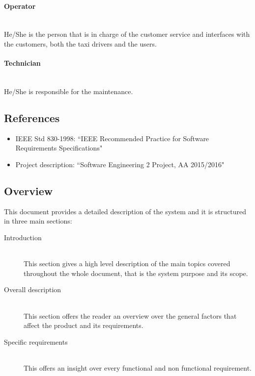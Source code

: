 \paragraph{Operator} \hfill \\
\label{def:operator} He/She is the person that is in charge of the customer service and interfaces with the customers, both the taxi drivers and the users.

\paragraph{Technician} \hfill \\
\label{def:technician} He/She is responsible for the maintenance.


\subsection{References}
\begin{itemize}
\item IEEE Std 830-1998: ``IEEE Recommended Practice for Software Requirements Specifications"
\item Project description: ``Software Engineering 2 Project, AA 2015/2016"
\end{itemize}


\subsection{Overview}
This document provides a detailed description of the system and it is structured in three main sections:

\begin{description}
  \item[Introduction] \hfill \\
  This section gives a high level description of the main topics covered throughout the whole document, that is the system purpose and its scope.
  \item[Overall description] \hfill \\
  This section offers the reader an overview over the general factors that affect the product and its requirements.
  \item[Specific requirements] \hfill \\
  This offers an insight over every functional and non functional requirement.
\end{description}